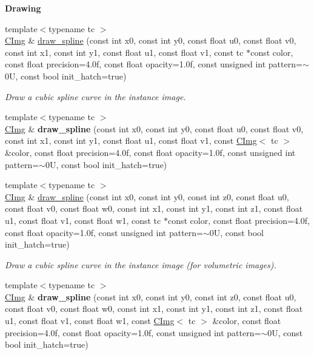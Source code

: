 \begin{Indent}{\bf Drawing}
\begin{DoxyCompactItemize}
\item 
{\footnotesize template$<$typename tc $>$ }\\\hyperlink{structcimg__library_1_1_c_img}{C\-Img} \& \hyperlink{structcimg__library_1_1_c_img_ae227ca08fc15c1e543e92d0778c218d7}{draw\-\_\-spline} (const int x0, const int y0, const float u0, const float v0, const int x1, const int y1, const float u1, const float v1, const tc $\ast$const color, const float precision=4.\-0f, const float opacity=1.\-0f, const unsigned int pattern=$\sim$0\-U, const bool init\-\_\-hatch=true)
\begin{DoxyCompactList}\small\item\em Draw a cubic spline curve in the instance image. \end{DoxyCompactList}\item 
\hypertarget{structcimg__library_1_1_c_img_a8fc551582c45827217e74ae1011fbda3}{{\footnotesize template$<$typename tc $>$ }\\\hyperlink{structcimg__library_1_1_c_img}{C\-Img} \& {\bfseries draw\-\_\-spline} (const int x0, const int y0, const float u0, const float v0, const int x1, const int y1, const float u1, const float v1, const \hyperlink{structcimg__library_1_1_c_img}{C\-Img}$<$ tc $>$ \&color, const float precision=4.\-0f, const float opacity=1.\-0f, const unsigned int pattern=$\sim$0\-U, const bool init\-\_\-hatch=true)}\label{structcimg__library_1_1_c_img_a8fc551582c45827217e74ae1011fbda3}

\item 
{\footnotesize template$<$typename tc $>$ }\\\hyperlink{structcimg__library_1_1_c_img}{C\-Img} \& \hyperlink{structcimg__library_1_1_c_img_ae38af70acd02e1b9530ab5b78d1f5d44}{draw\-\_\-spline} (const int x0, const int y0, const int z0, const float u0, const float v0, const float w0, const int x1, const int y1, const int z1, const float u1, const float v1, const float w1, const tc $\ast$const color, const float precision=4.\-0f, const float opacity=1.\-0f, const unsigned int pattern=$\sim$0\-U, const bool init\-\_\-hatch=true)
\begin{DoxyCompactList}\small\item\em Draw a cubic spline curve in the instance image (for volumetric images). \end{DoxyCompactList}\item 
\hypertarget{structcimg__library_1_1_c_img_ac944ff545e335462094b13fe81f7b2e2}{{\footnotesize template$<$typename tc $>$ }\\\hyperlink{structcimg__library_1_1_c_img}{C\-Img} \& {\bfseries draw\-\_\-spline} (const int x0, const int y0, const int z0, const float u0, const float v0, const float w0, const int x1, const int y1, const int z1, const float u1, const float v1, const float w1, const \hyperlink{structcimg__library_1_1_c_img}{C\-Img}$<$ tc $>$ \&color, const float precision=4.\-0f, const float opacity=1.\-0f, const unsigned int pattern=$\sim$0\-U, const bool init\-\_\-hatch=true)}\label{structcimg__library_1_1_c_img_ac944ff545e335462094b13fe81f7b2e2}


\end{DoxyCompactItemize}
\end{Indent}
